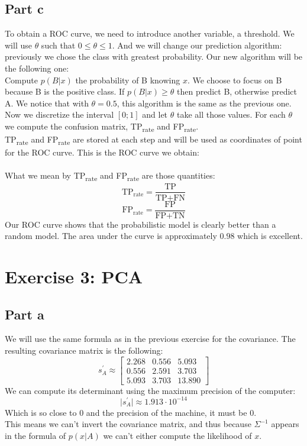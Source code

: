 \documentclass[a4paper, 10pt]{article}
\begin{document}
\subsection{Part c}
To obtain a ROC curve, we need to introduce another variable, a threshold. We will use
$\theta$ such that $0 \leq \theta \leq 1$. And we will change our prediction algorithm: previously
we chose the class with greatest probability. Our new algorithm will be the following one:
\\
Compute $p(B\vert x)$ the probability of B knowing $x$. We choose to focus on B because B is the positive class. 
If $p(B\vert x) \geq \theta$ then predict B, otherwise
predict A. We notice that with $\theta = 0.5$, this algorithm is the same as the previous one.
\\
Now we discretize the interval $[0;1]$ and let $\theta$ take all those values. For each $\theta$ we 
compute the confusion matrix, TP\textsubscript{rate} and FP\textsubscript{rate}.
\\
TP\textsubscript{rate} and FP\textsubscript{rate} are stored at each step and will be used as coordinates
of point for the ROC curve. This is the ROC curve we obtain:
\\
\\
What we mean by TP\textsubscript{rate} and FP\textsubscript{rate} are those quantities:
$$
\text{TP}_\text{rate} = \frac{\text{TP}}{\text{TP}+\text{FN}}
$$
$$
\text{FP}_\text{rate} = \frac{\text{FP}}{\text{FP}+\text{TN}}
$$
Our ROC curve shows that the probabilistic model is clearly better than a random model.
The area under the curve is approximately $0.98$ which is excellent.

\section{Exercise 3: PCA}
\subsection{Part a}
We will use the same formula as in the previous exercise for the covariance. The resulting
covariance matrix is the following:
$$
s^\prime_A \approx \begin{bmatrix}
    2.268 & 0.556 & 5.093 \\
    0.556 & 2.591 & 3.703 \\
    5.093 & 3.703 & 13.890
\end{bmatrix}
$$
We can compute its determinant using the maximum precision of the computer:
$$
\vert s^\prime_A\vert \approx 1.913 \cdot 10^{-14} 
$$
Which is so close to $0$ and the precision of the machine, it must be $0$.
\\
This means we can't invert the covariance matrix, and thus because $\Sigma^{-1}$ appears in the formula
of $p(x\vert A)$ we can't either compute the likelihood of $x$.
\end{document}
